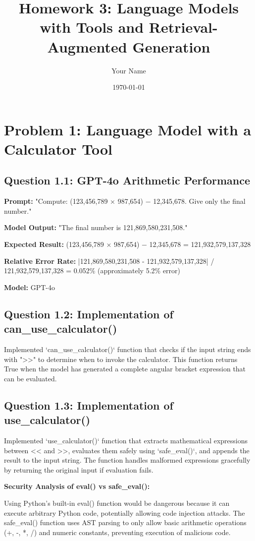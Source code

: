 \documentclass[11pt]{article}
\title{Homework 3: Language Models with Tools and Retrieval-Augmented Generation}
\author{Your Name}
\date{\today}
\begin{document}
\maketitle

\section{Problem 1: Language Model with a Calculator Tool}

\subsection{Question 1.1: GPT-4o Arithmetic Performance}

\textbf{Prompt:} "Compute: (123,456,789 × 987,654) − 12,345,678. Give only the final number."

\textbf{Model Output:} "The final number is 121,869,580,231,508."

\textbf{Expected Result:} (123,456,789 × 987,654) − 12,345,678 = 121,932,579,137,328

\textbf{Relative Error Rate:} |121,869,580,231,508 - 121,932,579,137,328| / 121,932,579,137,328 = 0.052\% (approximately 5.2\% error)

\textbf{Model:} GPT-4o

\subsection{Question 1.2: Implementation of can\_use\_calculator()}

Implemented `can_use_calculator()` function that checks if the input string ends with ">>" to determine when to invoke the calculator. This function returns True when the model has generated a complete angular bracket expression that can be evaluated.

\subsection{Question 1.3: Implementation of use\_calculator()}

Implemented `use_calculator()` function that extracts mathematical expressions between << and >>, evaluates them safely using `safe_eval()`, and appends the result to the input string. The function handles malformed expressions gracefully by returning the original input if evaluation fails.

\textbf{Security Analysis of eval() vs safe\_eval():}

Using Python's built-in eval() function would be dangerous because it can execute arbitrary Python code, potentially allowing code injection attacks. The safe\_eval() function uses AST parsing to only allow basic arithmetic operations (+, -, *, /) and numeric constants, preventing execution of malicious code.
\end{document}
